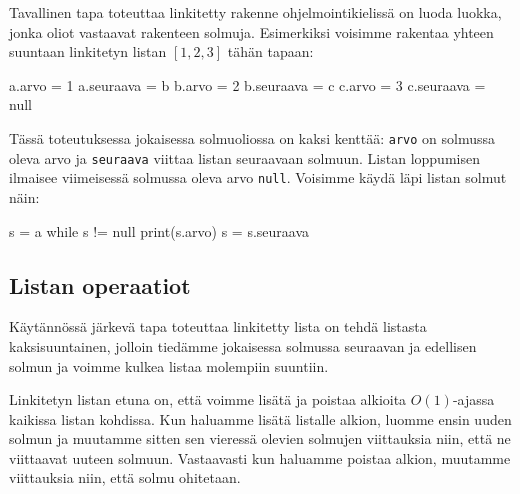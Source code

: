 Tavallinen tapa toteuttaa linkitetty rakenne ohjelmointikielissä
on luoda luokka, jonka oliot vastaavat rakenteen solmuja.
Esimerkiksi voisimme rakentaa yhteen suuntaan
linkitetyn listan $[1,2,3]$ tähän tapaan:

\begin{code}
a.arvo = 1
a.seuraava = b
b.arvo = 2
b.seuraava = c
c.arvo = 3
c.seuraava = null
\end{code}

Tässä toteutuksessa jokaisessa solmuoliossa on kaksi kenttää:
\texttt{arvo} on solmussa oleva arvo ja
\texttt{seuraava} viittaa listan seuraavaan solmuun.
Listan loppumisen ilmaisee viimeisessä solmussa oleva arvo \texttt{null}.
Voisimme käydä läpi listan solmut näin:

\begin{code}
s = a
while s != null
    print(s.arvo)
    s = s.seuraava
\end{code}

\subsection{Listan operaatiot}

Käytännössä järkevä tapa toteuttaa linkitetty lista on tehdä
listasta kaksisuuntainen, jolloin tiedämme jokaisessa solmussa
seuraavan ja edellisen solmun ja voimme kulkea listaa molempiin suuntiin.

Linkitetyn listan etuna on,
että voimme lisätä ja poistaa
alkioita $O(1)$-ajassa kaikissa listan kohdissa.
Kun haluamme lisätä listalle alkion,
luomme ensin uuden solmun ja muutamme sitten
sen vieressä olevien solmujen viittauksia niin,
että ne viittaavat uuteen solmuun.
Vastaavasti kun haluamme poistaa alkion,
muutamme viittauksia niin, että solmu ohitetaan.

